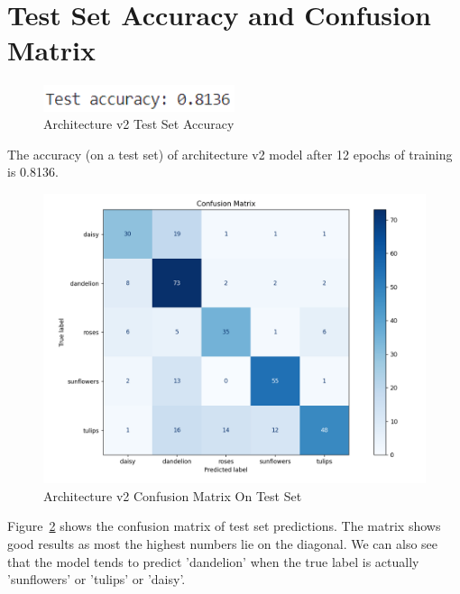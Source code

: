 \documentclass{article}
\begin{document}
\section*{Test Set Accuracy and Confusion Matrix}
\begin{figure}[H]
    \centering
    \includegraphics[width=0.5\textwidth]{test-accuracy-2.png}
    \caption{Architecture v2 Test Set Accuracy}
    \label{fig:test-accuracy-2}
\end{figure}
The accuracy (on a test set) of architecture v2 model after 12 epochs of training is 0.8136.
\begin{figure}[H]
    \centering
    \includegraphics[width=1\textwidth]{confusion-2.png}
    \caption{Architecture v2 Confusion Matrix On Test Set}
    \label{fig:confusion-2}
\end{figure}
Figure~\ref{fig:confusion-2} shows the confusion matrix of test set predictions. The matrix shows good results as most the highest numbers lie on the diagonal. We can also see that the model tends to predict 'dandelion' when the true label is actually 'sunflowers' or 'tulips' or 'daisy'.
\end{document}

